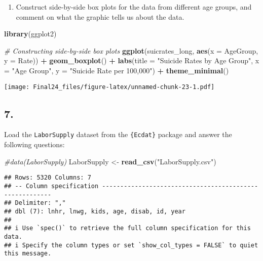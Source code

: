 \documentclass[
]{article}
\newenvironment{Shaded}{\begin{snugshade}}{\end{snugshade}}
\newcommand{\AttributeTok}[1]{\textcolor[rgb]{0.13,0.29,0.53}{#1}}
\newcommand{\CommentTok}[1]{\textcolor[rgb]{0.56,0.35,0.01}{\textit{#1}}}
\newcommand{\FunctionTok}[1]{\textcolor[rgb]{0.13,0.29,0.53}{\textbf{#1}}}
\newcommand{\NormalTok}[1]{#1}
\newcommand{\OtherTok}[1]{\textcolor[rgb]{0.56,0.35,0.01}{#1}}
\newcommand{\SpecialCharTok}[1]{\textcolor[rgb]{0.81,0.36,0.00}{\textbf{#1}}}
\newcommand{\StringTok}[1]{\textcolor[rgb]{0.31,0.60,0.02}{#1}}
\providecommand{\tightlist}{%
  \setlength{\itemsep}{0pt}\setlength{\parskip}{0pt}}
\begin{document}
\begin{enumerate}
\def\labelenumi{\alph{enumi}.}
\setcounter{enumi}{1}
\tightlist
\item
  Construct side-by-side box plots for the data from different age
  groups, and comment on what the graphic tells us about the data.
\end{enumerate}

\begin{Shaded}
\begin{Highlighting}[]
 \FunctionTok{library}\NormalTok{(ggplot2)}

\CommentTok{\# Constructing side{-}by{-}side box plots}
\FunctionTok{ggplot}\NormalTok{(suicrates\_long, }\FunctionTok{aes}\NormalTok{(}\AttributeTok{x =}\NormalTok{ AgeGroup, }\AttributeTok{y =}\NormalTok{ Rate)) }\SpecialCharTok{+}
  \FunctionTok{geom\_boxplot}\NormalTok{() }\SpecialCharTok{+}
  \FunctionTok{labs}\NormalTok{(}\AttributeTok{title =} \StringTok{"Suicide Rates by Age Group"}\NormalTok{,}
       \AttributeTok{x =} \StringTok{"Age Group"}\NormalTok{,}
       \AttributeTok{y =} \StringTok{"Suicide Rate per 100,000"}\NormalTok{) }\SpecialCharTok{+}
  \FunctionTok{theme\_minimal}\NormalTok{()}
\end{Highlighting}
\end{Shaded}

\texttt{[image: Final24\_files/figure-latex/unnamed-chunk-23-1.pdf]}

\subsection{7.}\label{section-6}

Load the \texttt{LaborSupply} dataset from the \texttt{\{Ecdat\}}
package and answer the following questions:

\begin{Shaded}
\begin{Highlighting}[]
\CommentTok{\#data(LaborSupply)}
\NormalTok{LaborSupply }\OtherTok{\textless{}{-}} \FunctionTok{read\_csv}\NormalTok{(}\StringTok{"LaborSupply.csv"}\NormalTok{)}
\end{Highlighting}
\end{Shaded}

\begin{verbatim}
## Rows: 5320 Columns: 7
## -- Column specification --------------------------------------------------------
## Delimiter: ","
## dbl (7): lnhr, lnwg, kids, age, disab, id, year
## 
## i Use `spec()` to retrieve the full column specification for this data.
## i Specify the column types or set `show_col_types = FALSE` to quiet this message.
\end{verbatim}
\end{document}
